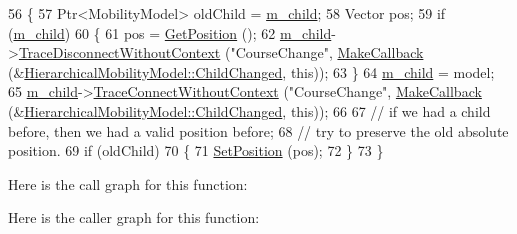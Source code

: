 \begin{DoxyCode}
56 \{
57   Ptr<MobilityModel> oldChild = \hyperlink{classns3_1_1HierarchicalMobilityModel_a07ebcdb83ae4934089832879b1b2f6ca}{m\_child};
58   Vector pos;
59   \textcolor{keywordflow}{if} (\hyperlink{classns3_1_1HierarchicalMobilityModel_a07ebcdb83ae4934089832879b1b2f6ca}{m\_child})
60     \{
61       pos = \hyperlink{classns3_1_1MobilityModel_aba838f06ec5bbb2d193d94b8c0e4abb4}{GetPosition} ();
62       \hyperlink{classns3_1_1HierarchicalMobilityModel_a07ebcdb83ae4934089832879b1b2f6ca}{m\_child}->\hyperlink{classns3_1_1ObjectBase_a460d74131ef97d9d7ba79c6d70b2f304}{TraceDisconnectWithoutContext} (\textcolor{stringliteral}{"CourseChange"}, 
      \hyperlink{group__makecallbackmemptr_ga9376283685aa99d204048d6a4b7610a4}{MakeCallback} (&\hyperlink{classns3_1_1HierarchicalMobilityModel_a48ec474c82848ebe47d0b182df0d1776}{HierarchicalMobilityModel::ChildChanged}, \textcolor{keyword}{
      this}));
63     \}
64   \hyperlink{classns3_1_1HierarchicalMobilityModel_a07ebcdb83ae4934089832879b1b2f6ca}{m\_child} = model;
65   \hyperlink{classns3_1_1HierarchicalMobilityModel_a07ebcdb83ae4934089832879b1b2f6ca}{m\_child}->\hyperlink{classns3_1_1ObjectBase_a1be45f6fd561e75dcac9dfa81b2b81e4}{TraceConnectWithoutContext} (\textcolor{stringliteral}{"CourseChange"}, 
      \hyperlink{group__makecallbackmemptr_ga9376283685aa99d204048d6a4b7610a4}{MakeCallback} (&\hyperlink{classns3_1_1HierarchicalMobilityModel_a48ec474c82848ebe47d0b182df0d1776}{HierarchicalMobilityModel::ChildChanged}, \textcolor{keyword}{
      this}));
66 
67   \textcolor{comment}{// if we had a child before, then we had a valid position before;}
68   \textcolor{comment}{// try to preserve the old absolute position.}
69   \textcolor{keywordflow}{if} (oldChild)
70     \{
71       \hyperlink{classns3_1_1MobilityModel_ac584b3d5a309709d2f13ed6ada1e7640}{SetPosition} (pos);
72     \}
73 \}
\end{DoxyCode}


Here is the call graph for this function\+:




Here is the caller graph for this function\+:


